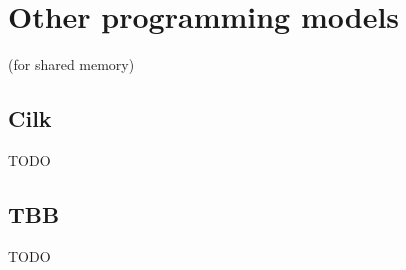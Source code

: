 \section{Other programming models}\label{sec:context:others}

(for shared memory)

\subsection{Cilk}

TODO

\subsection{TBB}

TODO
